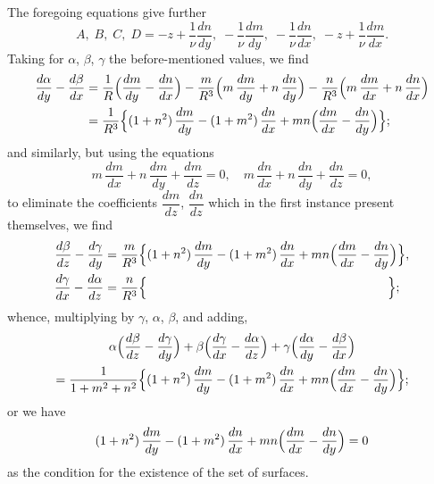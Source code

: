 \documentclass[12pt,a4paper]{article}
\begin{document}
The foregoing equations give further
\[
A,\; B,\; C,\; D = -z + \frac{1}{\nu}\frac{dn}{dy},\; -\frac{1}{\nu}\frac{dm}{dy},\; -\frac{1}{\nu}\frac{dn}{dx},\; -z + \frac{1}{\nu}\frac{dm}{dx}.
\]
Taking for $\alpha$, $\beta$, $\gamma$ the before-mentioned values, we find
\begin{align*}
\frac{d\alpha}{dy} - \frac{d\beta}{dx} &= \frac{1}{R}\Bigl(\frac{dm}{dy} - \frac{dn}{dx}\Bigr) - \frac{m}{R^3}\Bigl(m\,\frac{dm}{dy} + n\,\frac{dn}{dy}\Bigr) - \frac{n}{R^3}\Bigl(m\,\frac{dm}{dx} + n\,\frac{dn}{dx}\Bigr) \\
&= \frac{1}{R^3}\Bigl\{(1+n^2)\,\frac{dm}{dy} - (1+m^2)\,\frac{dn}{dx} + mn\Bigl(\frac{dm}{dx} - \frac{dn}{dy}\Bigr)\Bigr\};
\end{align*}
and similarly, but using the equations
\[
m\,\frac{dm}{dx} + n\,\frac{dm}{dy} + \frac{dm}{dz} = 0, \quad m\,\frac{dn}{dx} + n\,\frac{dn}{dy} + \frac{dn}{dz} = 0,
\]
to eliminate the coefficients $\dfrac{dm}{dz}$, $\dfrac{dn}{dz}$ which in the first instance present themselves, we find
\begin{align*}
\frac{d\beta}{dz} - \frac{d\gamma}{dy} &= \frac{m}{R^3}\Bigl\{(1+n^2)\,\frac{dm}{dy} - (1+m^2)\,\frac{dn}{dx} + mn\Bigl(\frac{dm}{dx} - \frac{dn}{dy}\Bigr)\Bigr\}, \\
\frac{d\gamma}{dx} - \frac{d\alpha}{dz} &= \frac{n}{R^3}\Bigl\{\qquad\qquad\qquad\qquad\qquad\qquad\qquad\qquad\qquad\quad\;\Bigr\};
\end{align*}
whence, multiplying by $\gamma$, $\alpha$, $\beta$, and adding,
\begin{multline*}
\alpha\Bigl(\frac{d\beta}{dz} - \frac{d\gamma}{dy}\Bigr) + \beta\Bigl(\frac{d\gamma}{dx} - \frac{d\alpha}{dz}\Bigr) + \gamma\Bigl(\frac{d\alpha}{dy} - \frac{d\beta}{dx}\Bigr) \\
= \frac{1}{1+m^2+n^2}\Bigl\{(1+n^2)\,\frac{dm}{dy} - (1+m^2)\,\frac{dn}{dx} + mn\Bigl(\frac{dm}{dx} - \frac{dn}{dy}\Bigr)\Bigr\};
\end{multline*}
or we have
\[
(1+n^2)\,\frac{dm}{dy} - (1+m^2)\,\frac{dn}{dx} + mn\Bigl(\frac{dm}{dx} - \frac{dn}{dy}\Bigr) = 0
\]
as the condition for the existence of the set of surfaces.

\newpage
\end{document}
